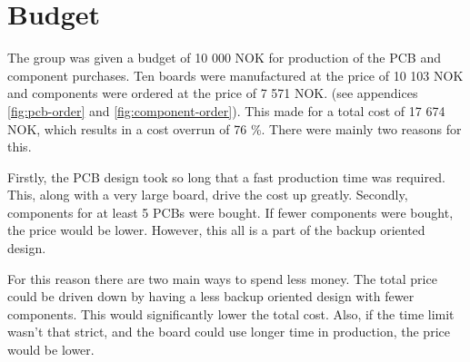 \documentclass[../main/report.tex]{subfiles}
\begin{document}
\section{Budget}

The group was given a budget of 10 000 NOK for production of the PCB and component purchases. 
Ten boards were manufactured at the price of 10 103 NOK and components were ordered at the price of 7 571 NOK. (see appendices \ref{fig:pcb-order} and \ref{fig:component-order}).
This made for a total cost of 17 674 NOK, which results in a cost overrun of 76 \%.
There were mainly two reasons for this.

Firstly, the PCB design took so long that a fast production time was required.
This, along with a very large board, drive the cost up greatly.
Secondly, components for at least 5 PCBs were bought.
If fewer components were bought, the price would be lower.
However, this all is a part of the backup oriented design.

For this reason there are two main ways to spend less money.
The total price could be driven down by having a less backup oriented design with fewer components.
This would significantly lower the total cost.
Also, if the time limit wasn't that strict, and the board could use longer time in production, the price would be lower.
\end{document}
